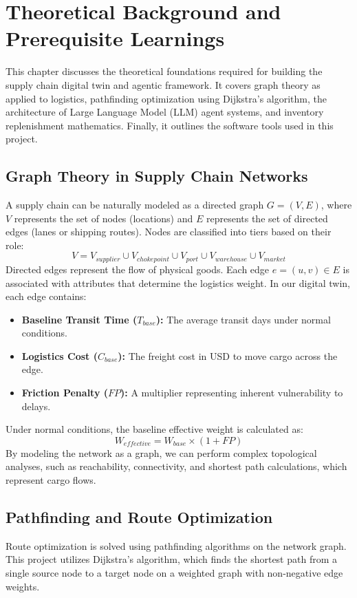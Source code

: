 \chapter{Theoretical Background and Prerequisite Learnings}
This chapter discusses the theoretical foundations required for building the supply chain digital twin and agentic framework. It covers graph theory as applied to logistics, pathfinding optimization using Dijkstra's algorithm, the architecture of Large Language Model (LLM) agent systems, and inventory replenishment mathematics. Finally, it outlines the software tools used in this project.

\section{Graph Theory in Supply Chain Networks}
A supply chain can be naturally modeled as a directed graph $G = (V, E)$, where $V$ represents the set of nodes (locations) and $E$ represents the set of directed edges (lanes or shipping routes).
Nodes are classified into tiers based on their role:
\begin{equation}
    V = V_{supplier} \cup V_{chokepoint} \cup V_{port} \cup V_{warehouse} \cup V_{market}
\end{equation}
Directed edges represent the flow of physical goods. Each edge $e = (u, v) \in E$ is associated with attributes that determine the logistics weight. In our digital twin, each edge contains:
\begin{itemize}
    \item \textbf{Baseline Transit Time ($T_{base}$):} The average transit days under normal conditions.
    \item \textbf{Logistics Cost ($C_{base}$):} The freight cost in USD to move cargo across the edge.
    \item \textbf{Friction Penalty ($FP$):} A multiplier representing inherent vulnerability to delays.
\end{itemize}

Under normal conditions, the baseline effective weight is calculated as:
\begin{equation}
    W_{effective} = W_{base} \times (1 + FP)
\end{equation}
By modeling the network as a graph, we can perform complex topological analyses, such as reachability, connectivity, and shortest path calculations, which represent cargo flows.

\section{Pathfinding and Route Optimization}
Route optimization is solved using pathfinding algorithms on the network graph. This project utilizes Dijkstra's algorithm, which finds the shortest path from a single source node to a target node on a weighted graph with non-negative edge weights.

